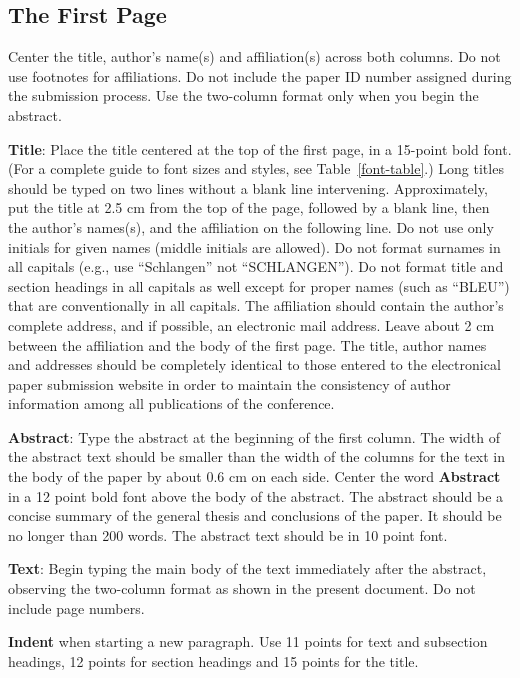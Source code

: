 \documentclass[11pt]{article}
\begin{document}
\subsection{The First Page}
\label{ssec:first}

Center the title, author's name(s) and affiliation(s) across both
columns. Do not use footnotes for affiliations. Do not include the
paper ID number assigned during the submission process. Use the
two-column format only when you begin the abstract.

{\bf Title}: Place the title centered at the top of the first page, in
a 15-point bold font. (For a complete guide to font sizes and styles, 
see Table~\ref{font-table}.) Long titles should be typed on two lines without
a blank line intervening. Approximately, put the title at 2.5 cm from
the top of the page, followed by a blank line, then the author's
names(s), and the affiliation on the following line. Do not use only
initials for given names (middle initials are allowed). Do not format surnames
in all capitals (e.g., use ``Schlangen'' not ``SCHLANGEN'').
Do not format title and section headings in all capitals as well
except for proper names (such as ``BLEU'') that are conventionally
in all capitals.
The affiliation should contain the author's complete address, and if
possible, an electronic mail address. Leave about 2 cm between the
affiliation and the body of the first page.
The title, author names and addresses should be completely
identical to those entered to the electronical paper submission
website in order to maintain the consistency of author information
among all publications of the conference.

{\bf Abstract}: Type the abstract at the beginning of the first
column. The width of the abstract text should be smaller than the
width of the columns for the text in the body of the paper by about
0.6 cm on each side. Center the word {\bf Abstract} in a 12 point bold
font above the body of the abstract. The abstract should be a concise
summary of the general thesis and conclusions of the paper. It should
be no longer than 200 words. The abstract text should be in 10 point font.

{\bf Text}: Begin typing the main body of the text immediately after
the abstract, observing the two-column format as shown in 
the present document. Do not include page numbers.

{\bf Indent} when starting a new paragraph. Use 11 points for text and 
subsection headings, 12 points for section headings and 15 points for
the title. 
\end{document}
